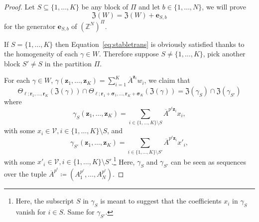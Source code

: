 \documentclass[letterpaper, 11pt, thm-restate]{article}
\numberwithin{equation}{section}
\newcommand{\Z}{\mathbb{Z}}
\newcommand{\mV}{\mathcal{V}}
\newcommand{\mZ}{\mathfrak{Z}}
\newcommand{\be}{\boldsymbol{e}}
\newcommand{\br}{\boldsymbol{r}}
\newcommand{\bz}{\boldsymbol{z}}
\newcommand{\bsig}{\boldsymbol{\sigma}}
\newcommand{\oA}{\overline{A}}
\theoremstyle{definition}
\theoremstyle{definition}
\theoremstyle{definition}
\begin{document}
\begin{proof}
    Let $S \subseteq \{1, \ldots, K\}$ be any block of $\Pi$ and let $b \in \{1, \ldots, N\}$, we will prove
    \begin{equation}
        \mZ(W) = \mZ(W) + \be_{S, b}
    \end{equation}
    for the generator $\be_{S, b}$ of $(\Z^N)^{\Pi}$.

    If $S = \{1, \ldots, K\}$ then Equation~\eqref{eq:stabletrans} is obviously satisfied thanks to the homogeneity of each $\gamma \in W$.
    Therefore suppose $S \neq \{1, \ldots, K\}$, pick another block $S' \neq S$ in the partition $\Pi$.

    For each $\gamma \in W$, $\gamma(\bz_1, \ldots, \bz_K) = \sum_{i = 1}^K \oA^{\bz_i} w_i$, we claim that
    \begin{equation}\label{eq:interdegen}
    \Theta_{\ell; \br_1, \ldots, \br_K}(\mZ(\gamma)) \cap \Theta_{\ell; \br_{1} + \bsig_{1}, \ldots, \br_{K} + \bsig_{K}}(\mZ(\gamma)) = \mZ(\gamma_S) \cap \mZ(\gamma_{S'})
    \end{equation}
    where
    \begin{equation}\label{eq:defbeta}
    \gamma_S(\bz_{1}, \ldots, \bz_{K}) = \sum_{i \in \{1, \ldots, K\} \setminus S} \oA^{p^{\ell} \bz_i} x_i,
    \end{equation}
    with some $x_i \in \mV, i \in \{1, \ldots, K\} \setminus S$, and
    \begin{equation}\label{eq:defbetap}
    \gamma_{S'}(\bz_{1}, \ldots, \bz_{K}) = \sum_{i \in \{1, \ldots, K\} \setminus S'} \oA^{p^{\ell} \bz_i} x'_i,
    \end{equation}
    with some $x'_i \in \mV, i \in \{1, \ldots, K\} \setminus S'$.\footnote{Here, the subscript $S$ in $\gamma_S$ is meant to suggest that the coefficients $x_i$ in $\gamma_S$ vanish for $i \in S$. Same for $\gamma_{S'}$.}
    Here, $\gamma_S$ and $\gamma_{S'}$ can be seen as sequences over the tuple $\oA^{p^{\ell}} \coloneqq \left(A_1^{p^{\ell}}, \ldots, A_N^{p^{\ell}}\right)$.
    

\end{proof}
\end{document}
